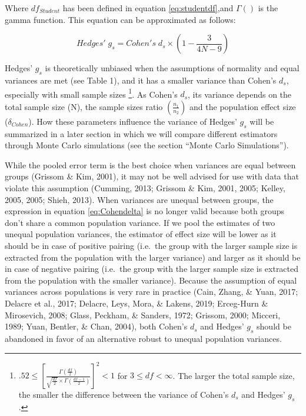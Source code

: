 \documentclass[
  man,floatsintext]{apa6}
\begin{document}
Where \(df_{Student}\) has been defined in equation \ref{eq:studentdf},and \(\Gamma()\) is the gamma function. This equation can be approximated as follows:

\begin{equation} 
Hedges' \; g_s = Cohen's \; d_s \times \left( 1- \frac{3}{4N -9} \right)
\label{eq:Hedgesgsapprox}
\end{equation}

Hedges' \(g_s\) is theoretically unbiased when the assumptions of normality and equal variances are met (see Table 1), and it has a smaller variance than Cohen's \(d_s\), especially with small sample sizes \footnote{$.52 \le \left[\frac{\Gamma(\frac{df}{2})}{\sqrt{\frac{df}{2}} \times \Gamma(\frac{df-1}{2})} \right] ^2 < 1$ for $3 \le df < \infty$. The larger the total sample size, the smaller the difference between the variance of Cohen's $d_s$ and Hedges' $g_s$.}. As Cohen's \(d_s\), its variance depends on the total sample size (N), the sample sizes ratio \(\left( \frac{n_1}{n_2}\right)\) and the population effect size (\(\delta_{Cohen}\)). How these parameters influence the variance of Hedges' \(g_s\) will be summarized in a later section in which we will compare different estimators through Monte Carlo simulations (see the section \enquote{Monte Carlo Simulations}).

While the pooled error term is the best choice when variances are equal between groups (Grissom \& Kim, 2001), it may not be well advised for use with data that violate this assumption (Cumming, 2013; Grissom \& Kim, 2001, 2005; Kelley, 2005, 2005; Shieh, 2013). When variances are unequal between groups, the expression in equation \ref{eq:Cohendelta} is no longer valid because both groups don't share a common population variance. If we pool the estimates of two unequal population variances, the estimator of effect size will be lower as it should be in case of positive pairing (i.e.~the group with the larger sample size is extracted from the population with the larger variance) and larger as it should be in case of negative pairing (i.e.~the group with the larger sample size is extracted from the population with the smaller variance). Because the assumption of equal variances across populations is very rare in practice (Cain, Zhang, \& Yuan, 2017; Delacre et al., 2017; Delacre, Leys, Mora, \& Lakens, 2019; Erceg-Hurn \& Mirosevich, 2008; Glass, Peckham, \& Sanders, 1972; Grissom, 2000; Micceri, 1989; Yuan, Bentler, \& Chan, 2004), both Cohen's \(d_s\) and Hedges' \(g_s\) should be abandoned in favor of an alternative robust to unequal population variances.
\end{document}
